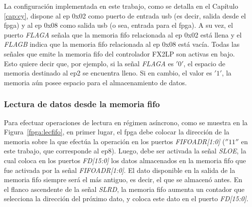 	La configuración implementada en este trabajo, como se detalla en el Capítulo \ref{cap:cy}, dispone al \acrshort{ep} 0x02 como puerto de entrada \acrshort{usb} (es decir, salida desde el \acrshort{fpga}) y al \acrshort{ep} 0x08 como salida \acrshort{usb} (o sea, entrada para el \acrshort{fpga}). A su vez, el puerto \textit{FLAGA} señala que la memoria \acrshort{fifo} relacionada al \acrshort{ep} 0x02 está llena y el \textit{FLAGB} indica que la memoria \acrshort{fifo} relacionada al \acrshort{ep} 0x08 está vacía. Todas las señales que emite la memoria \acrshort{fifo} del controlador FX2LP son activas en bajo. Esto quiere decir que, por ejemplo, si la señal \textit{FLAGA} es $'0'$, el espacio de memoria destinado al \acrshort{ep}2 se encuentra lleno. Si en cambio, el valor es $'1'$, la memoria aún posee espacio para el almacenamiento de datos.
	

\subsubsection{Lectura de datos desde la memoria \acrshort{fifo}}

	Para efectuar operaciones de lectura en régimen asíncrono, como se muestra en la Figura~\ref{fpga:lecfifo}, en primer lugar, el \acrshort{fpga} debe colocar la dirección de la memoria sobre la que efectúa la operación  en los puertos \textit{FIFOADR[1:0]} ($''11''$ en este trabajo, que corresponde al \acrshort{ep}8). Luego, debe ser activada la señal \textit{SLOE}, la cual coloca en los puertos \textit{FD[15:0]} los datos almacenados en la memoria \acrshort{fifo} que fue activada por la señal \textit{FIFOADR[1:0]}. El dato disponible en la salida de la memoria \acrshort{fifo} siempre será el más antiguo, es decir, el que se almacenó antes. En el flanco ascendente de la señal \textit{SLRD}, la memoria \acrshort{fifo} aumenta un contador que selecciona la dirección del próximo dato, y coloca este dato en el puerto \textit{FD[15:0]}.

